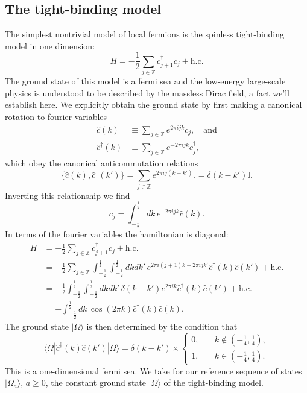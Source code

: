 \documentclass[prl,twocolumn,lengthcheck,superscriptaddress]{revtex4-1}
\theoremstyle{definition}
\theoremstyle{remark}
\begin{document}
\subsection{The tight-binding model}
The simplest nontrivial model of local fermions is the spinless tight-binding model in one dimension:
\begin{equation}
	H = -\frac12\sum_{j\in \mathbb{Z}} c_{j+1}^\dag c_j + \text{h.c.}
\end{equation}
The ground state of this model is a fermi sea and the low-energy large-scale physics is understood to be described by the massless Dirac field, a fact we'll establish here. We explicitly obtain the ground state by first making a canonical rotation to fourier variables
\begin{equation}
	\begin{split}
		\widehat{c}(k) &\equiv \sum_{j\in\mathbb{Z}} e^{2\pi i jk} c_j, \quad \text{and} \\
		\widehat{c}^\dag(k) &\equiv \sum_{j\in\mathbb{Z}} e^{-2\pi i jk} c_j^\dag,
	\end{split}
\end{equation}
which obey the canonical anticommutation relations
\begin{equation}
	\{\widehat{c}(k), \widehat{c}^\dag(k')\} = \sum_{j\in\mathbb{Z}} e^{2\pi i j(k-k')}\mathbb{I} = \delta(k-k')\mathbb{I}.
\end{equation}
Inverting this relationship we find 
\begin{equation}
	c_j = \int_{-\frac12}^{\frac12} dk\, e^{-2\pi ijk} \widehat{c}(k).
\end{equation}
In terms of the fourier variables the hamiltonian is diagonal:
\begin{equation}
	\begin{split}
		H &= -\frac12\sum_{j\in \mathbb{Z}} c_{j+1}^\dag c_j + \text{h.c.} \\
		&= -\frac12\sum_{j\in \mathbb{Z}}\int_{-\frac12}^\frac12 \int_{-\frac12}^\frac12 dkdk'\, e^{2\pi i (j+1)k- 2\pi i j k'} \widehat{c}^\dag(k) \widehat{c}(k') + \text{h.c.} \\ 
		&= -\frac12\int_{-\frac12}^\frac12 \int_{-\frac12}^\frac12 dkdk'\, \delta(k-k') e^{2\pi i k} \widehat{c}^\dag(k) \widehat{c}(k') + \text{h.c.} \\ 
		&= -\int_{-\frac12}^\frac12 dk\, \cos(2\pi k) \widehat{c}^\dag(k) \widehat{c}(k).
	\end{split}
\end{equation}
The ground state $|\Omega\rangle$ is then determined by the condition that 
\begin{equation}
\langle \Omega|\widehat{c}^\dag(k) \widehat{c}(k')|\Omega\rangle = \delta(k-k')\times \begin{cases}
	0, &\quad k \not\in (-\frac14, \frac14), \\
	1, &\quad k \in (-\frac14, \frac14).
\end{cases}
\end{equation}
This is a one-dimensional fermi sea. We take for our reference sequence of states $|\Omega_a\rangle$, $a\ge 0$, the constant ground state $|\Omega\rangle$ of the tight-binding model.
\end{document}
